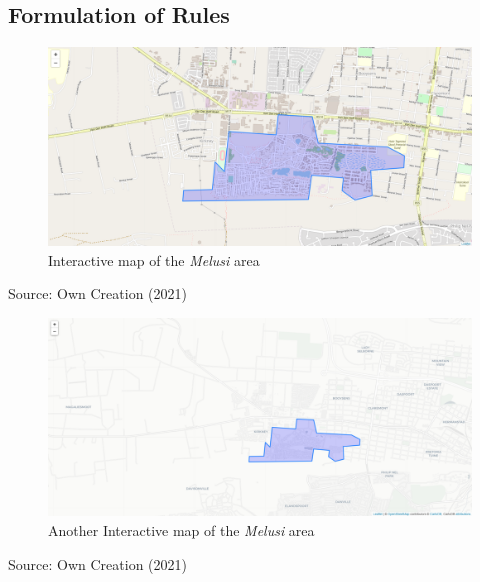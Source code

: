 \subsection{Formulation of Rules}


\begin{figure}[H]
\centering
\includegraphics[scale=0.30,angle=90]{Figures/Chapter3/Folium}
\caption{Interactive map of the \textit{Melusi} area}
\label{fig:fol}
\end{figure}
\begin{center}
Source: Own Creation (2021)
\end{center}
\pagebreak
\begin{figure}[H]
\centering
\includegraphics[scale=0.5,angle=90]{Figures/Chapter3/Folium2}
\caption{Another Interactive map of the \textit{Melusi} area}
\label{fig:fol2}
\end{figure}
\begin{center}
Source: Own Creation (2021)
\end{center}